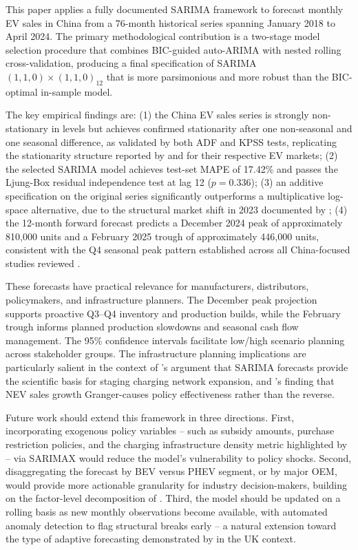 \documentclass[12pt]{article}
\begin{document}
This paper applies a fully documented SARIMA framework to forecast monthly EV sales in China from a 76-month historical series spanning January 2018 to April 2024. The primary methodological contribution is a two-stage model selection procedure that combines BIC-guided auto-ARIMA with nested rolling cross-validation, producing a final specification of SARIMA$(1,1,0)\times(1,1,0)_{12}$ that is more parsimonious and more robust than the BIC-optimal in-sample model.

The key empirical findings are: (1) the China EV sales series is strongly non-stationary in levels but achieves confirmed stationarity after one non-seasonal and one seasonal difference, as validated by both ADF and KPSS tests, replicating the stationarity structure reported by \citet{liang2025} and \citet{lu2024} for their respective EV markets; (2) the selected SARIMA model achieves test-set MAPE of 17.42\% and passes the Ljung-Box residual independence test at lag 12 ($p = 0.336$); (3) an additive specification on the original series significantly outperforms a multiplicative log-space alternative, due to the structural market shift in 2023 documented by \citet{chen2025}; (4) the 12-month forward forecast predicts a December 2024 peak of approximately 810,000 units and a February 2025 trough of approximately 446,000 units, consistent with the Q4 seasonal peak pattern established across all China-focused studies reviewed \citep{chen2025, liang2025, ge2024, yang2024}.

These forecasts have practical relevance for manufacturers, distributors, policymakers, and infrastructure planners. The December peak projection supports proactive Q3--Q4 inventory and production builds, while the February trough informs planned production slowdowns and seasonal cash flow management. The 95\% confidence intervals facilitate low/high scenario planning across stakeholder groups. The infrastructure planning implications are particularly salient in the context of \citet{chen2025}'s argument that SARIMA forecasts provide the scientific basis for staging charging network expansion, and \citet{ge2024}'s finding that NEV sales growth Granger-causes policy effectiveness rather than the reverse.

Future work should extend this framework in three directions. First, incorporating exogenous policy variables -- such as subsidy amounts, purchase restriction policies, and the charging infrastructure density metric highlighted by \citet{yang2024} -- via SARIMAX would reduce the model's vulnerability to policy shocks. Second, disaggregating the forecast by BEV versus PHEV segment, or by major OEM, would provide more actionable granularity for industry decision-makers, building on the factor-level decomposition of \citet{ge2024}. Third, the model should be updated on a rolling basis as new monthly observations become available, with automated anomaly detection to flag structural breaks early -- a natural extension toward the type of adaptive forecasting demonstrated by \citet{lu2024} in the UK context.
\end{document}
